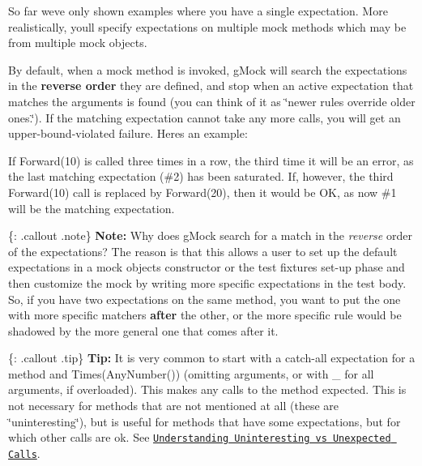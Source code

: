 So far we\textquotesingle{}ve only shown examples where you have a single expectation. More realistically, you\textquotesingle{}ll specify expectations on multiple mock methods which may be from multiple mock objects.

By default, when a mock method is invoked, g\+Mock will search the expectations in the {\bfseries reverse order} they are defined, and stop when an active expectation that matches the arguments is found (you can think of it as \char`\"{}newer rules override
older ones.\char`\"{}). If the matching expectation cannot take any more calls, you will get an upper-\/bound-\/violated failure. Here\textquotesingle{}s an example\+:




If {\ttfamily Forward(10)} is called three times in a row, the third time it will be an error, as the last matching expectation (\#2) has been saturated. If, however, the third {\ttfamily Forward(10)} call is replaced by {\ttfamily Forward(20)}, then it would be OK, as now \#1 will be the matching expectation.

\{\+: .callout .note\} {\bfseries Note\+:} Why does g\+Mock search for a match in the {\itshape reverse} order of the expectations? The reason is that this allows a user to set up the default expectations in a mock object\textquotesingle{}s constructor or the test fixture\textquotesingle{}s set-\/up phase and then customize the mock by writing more specific expectations in the test body. So, if you have two expectations on the same method, you want to put the one with more specific matchers {\bfseries after} the other, or the more specific rule would be shadowed by the more general one that comes after it.

\{\+: .callout .tip\} {\bfseries Tip\+:} It is very common to start with a catch-\/all expectation for a method and {\ttfamily Times(\+Any\+Number())} (omitting arguments, or with {\ttfamily \+\_\+} for all arguments, if overloaded). This makes any calls to the method expected. This is not necessary for methods that are not mentioned at all (these are \char`\"{}uninteresting\char`\"{}), but is useful for methods that have some expectations, but for which other calls are ok. See \href{gmock_cook_book.md#uninteresting-vs-unexpected}{\tt Understanding Uninteresting vs Unexpected Calls}.

